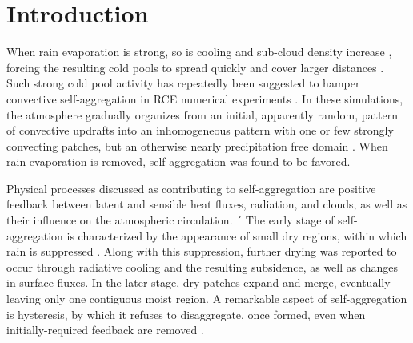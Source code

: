\documentclass[reprint,amsmath,amssymb]{revtex4-1}
\begin{document}
\maketitle

\section{Introduction}
When rain evaporation is strong, so is cooling and sub-cloud density increase \cite{simpson1980downdrafts,engerer2008surface}, forcing the resulting cold pools to spread quickly and cover larger distances \cite{romps2016sizes,torri2015mechanisms,zuidema2017survey}.
Such strong cold pool activity has repeatedly been suggested to hamper convective self-aggregation in RCE numerical experiments \cite{jeevanjee2013convective,muller2015favors,holloway2016sensitivity,hohenegger2016coupled}.
In these simulations, the atmosphere gradually organizes from an initial, apparently random, pattern of convective updrafts into an inhomogeneous pattern with one or few strongly convecting patches, but an otherwise nearly precipitation free domain \cite{held1993radiative,tompkins1998radiative,bretherton2005energy,hohenegger2016coupled,wing2017convective}. 
When rain evaporation is removed, self-aggregation was found to be favored.

Physical processes discussed as contributing to self-aggregation are positive feedback between latent and sensible heat fluxes, radiation, and clouds, as well as their influence on the atmospheric circulation. ´
The early stage of self-aggregation is characterized by the appearance of small dry regions, within which rain is suppressed \citep{holloway2017observing}.
Along with this suppression, further drying was reported to occur through radiative cooling and the resulting subsidence, as well as changes in surface fluxes.
In the later stage, dry patches expand and merge, eventually leaving only one contiguous moist region.
A remarkable aspect of self-aggregation is hysteresis, by which it refuses to disaggregate, once formed, even when initially-required feedback are removed \cite{khairoutdinov2010aggregation,muller2012detailed,muller2015favors}.
\end{document}
